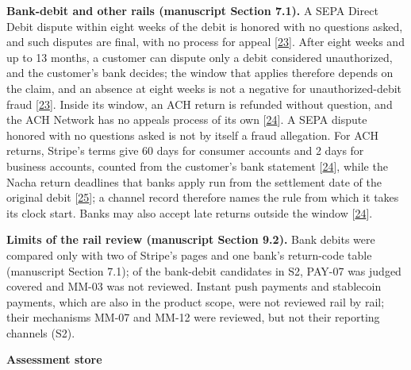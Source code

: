 \documentclass[
  11pt,
]{article}
\begin{document}
\textbf{Bank-debit and other rails (manuscript Section 7.1).} A SEPA
Direct Debit dispute within eight weeks of the debit is honored with no
questions asked, and such disputes are final, with no process for appeal
{[}\protect\hyperlink{ref-Stripe2026SEPADebit}{23}{]}. After eight weeks
and up to 13 months, a customer can dispute only a debit considered
unauthorized, and the customer's bank decides; the window that applies
therefore depends on the claim, and an absence at eight weeks is not a
negative for unauthorized-debit fraud
{[}\protect\hyperlink{ref-Stripe2026SEPADebit}{23}{]}. Inside its
window, an ACH return is refunded without question, and the ACH Network
has no appeals process of its own
{[}\protect\hyperlink{ref-Stripe2026ACHTerms}{24}{]}. A SEPA dispute
honored with no questions asked is not by itself a fraud allegation. For
ACH returns, Stripe's terms give 60 days for consumer accounts and 2
days for business accounts, counted from the customer's bank statement
{[}\protect\hyperlink{ref-Stripe2026ACHTerms}{24}{]}, while the Nacha
return deadlines that banks apply run from the settlement date of the
original debit {[}\protect\hyperlink{ref-LeadBank2026ACHReturns}{25}{]};
a channel record therefore names the rule from which it takes its clock
start. Banks may also accept late returns outside the window
{[}\protect\hyperlink{ref-Stripe2026ACHTerms}{24}{]}.

\textbf{Limits of the rail review (manuscript Section 9.2).} Bank debits
were compared only with two of Stripe's pages and one bank's return-code
table (manuscript Section 7.1); of the bank-debit candidates in S2,
\mbox{PAY-07} was judged covered and \mbox{MM-03} was not reviewed.
Instant push payments and stablecoin payments, which are also in the
product scope, were not reviewed rail by rail; their mechanisms
\mbox{MM-07} and \mbox{MM-12} were reviewed, but not their reporting
channels (S2).


\textbf{Assessment store}
\end{document}
